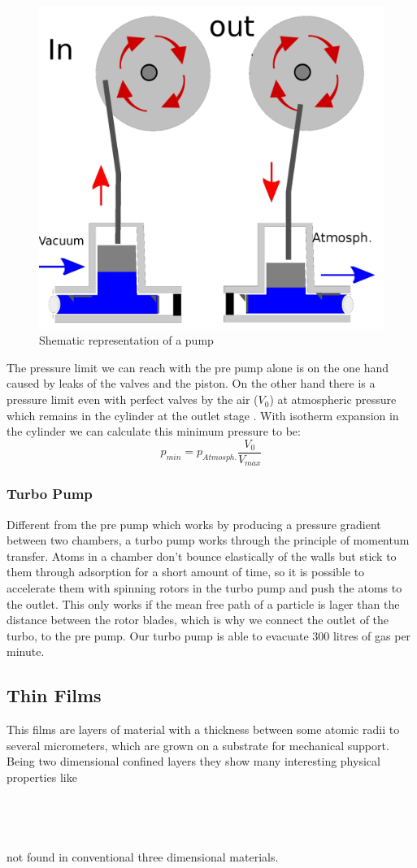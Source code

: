 \documentclass[]{article}
\begin{document}
\begin{figure}[h]
	
	\centering
	\includegraphics[width=0.7\linewidth]{Bilder/pump}
	
	\caption{Shematic representation of a pump}
	\label{fig:prepump}
\end{figure}


The pressure limit we can reach with the pre pump alone is on the one hand caused by leaks of the valves and the piston. On the other hand there is a pressure limit even with perfect valves by the air ($V_{0} $) at atmospheric pressure which remains in the cylinder at the outlet stage . With isotherm expansion in the cylinder we can calculate this minimum pressure to be: \[ p_{min}=p_{Atmosph.}\frac{V_{0}}{V_{max}} \]
\subsubsection{Turbo Pump}
Different from the pre pump which works by producing a pressure gradient between two chambers, a turbo pump works through the principle of momentum transfer. Atoms in a chamber don't bounce elastically of the walls but stick to them through adsorption for a short amount of time, so it is possible to accelerate them with spinning rotors in the turbo pump and push the atoms to the outlet. This only works if the mean free path of a particle is lager than the distance between the rotor blades, which is why we connect the outlet of the turbo, to the pre pump. Our turbo pump is able to evacuate 300 litres of gas per minute.
\subsection{Thin Films}
This films are layers of material with a thickness between some atomic radii to several micrometers, which are grown on a substrate for mechanical support. Being two dimensional confined layers they show many interesting physical properties like \\\\\\\\\\ not found in conventional three dimensional materials.
\end{document}
